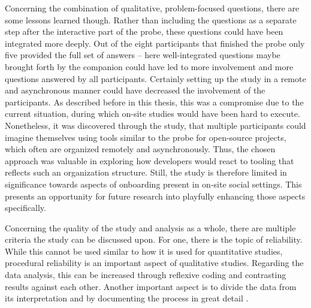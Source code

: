 Concerning the combination of qualitative, problem-focused questions, there are some lessons learned though. Rather than including the questions as a separate step after the interactive part of the probe, these questions could have been integrated more deeply. Out of the eight participants that finished the probe only five provided the full set of answers -- here well-integrated questions maybe brought forth by the companion could have led to more involvement and more questions answered by all participants. Certainly setting up the study in a remote and asynchronous manner could have decreased the involvement of the participants. As described before in this thesis, this was a compromise due to the current situation, during which on-site studies would have been hard to execute. Nonetheless, it was discovered through the study, that multiple participants could imagine themselves using tools similar to the probe for open-source projects, which often are organized remotely and asynchronously. Thus, the chosen approach was valuable in exploring how developers would react to tooling that reflects such an organization structure. Still, the study is therefore limited in significance towards aspects of onboarding present in on-site social settings. This presents an opportunity for future research into playfully enhancing those aspects specifically.

Concerning the quality of the study and analysis as a whole, there are multiple criteria the study can be discussed upon. For one, there is the topic of reliability. While this cannot be used similar to how it is used for quantitative studies, procedural reliability is an important aspect of qualitative studies. Regarding the data analysis, this can be increased through reflexive coding and contrasting results against each other. Another important aspect is to divide the data from its interpretation and by documenting the process in great detail \cite[p. 541-543]{flick2018introduction}.


